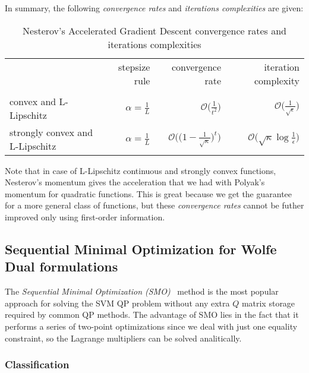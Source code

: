 
In summary, the following \emph{convergence rates} and \emph{iterations complexities} are given:

\begin{table}[H]
\centering
\caption{Nesterov's Accelerated Gradient Descent convergence rates and iterations complexities}
\label{nesterov_gradient_rates}
\begin{tabular}{lrrr}
\toprule
	& stepsize rule & convergence rate & iteration complexity \\
 	& 		& 		& 		\\
\midrule
convex and L-Lipschitz & $\displaystyle \alpha = \frac{1}{L}$ & $\displaystyle \mathcal{O}\Bigg(\frac{1}{t^2}\Bigg)$ & $\displaystyle \mathcal{O}\Bigg(\frac{1}{\sqrt{\epsilon}}\Bigg)$ \\
strongly convex and L-Lipschitz & $\displaystyle \alpha = \frac{1}{L}$ & $\displaystyle \mathcal{O}\Bigg(\Bigg(1 - \frac{1}{\sqrt{\kappa}}\Bigg)^t\Bigg)$ & $\displaystyle \mathcal{O}\Bigg(\sqrt{\kappa}\log \frac{1}{\epsilon}\Bigg)$ \\
\bottomrule
\end{tabular}
\end{table}

Note that in case of L-Lipschitz continuous and strongly convex functions, Nesterov's momentum gives the acceleration that we had with Polyak’s momentum for quadratic functions. This is great because we get the guarantee for a more general class of functions, but these \emph{convergence rates} cannot be futher improved only using first-order information.

\pagebreak

\subsection{Sequential Minimal Optimization for Wolfe Dual formulations}

The \emph{Sequential Minimal Optimization (SMO)}~\cite{platt1998sequential} method is the most popular approach for solving the SVM QP problem without any extra $Q$ matrix storage required by common QP methods. The advantage of SMO lies in the fact that it performs a series of two-point optimizations since we deal with just one equality constraint, so the Lagrange multipliers can be solved analitically.

\subsubsection{Classification}

